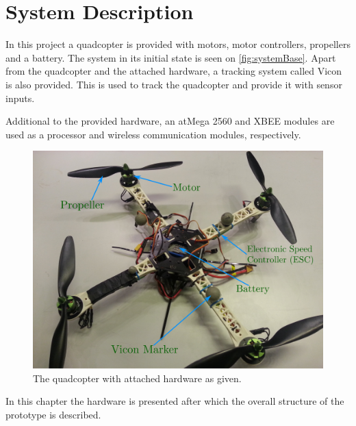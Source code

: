 \chapter{System Description}
In this project a quadcopter is provided with motors, motor controllers, propellers and a battery. The system in its initial state is seen on \autoref{fig:systemBase}. Apart from the quadcopter and the attached hardware, a tracking system called Vicon is also provided. This is used to track the quadcopter and provide it with sensor inputs.

Additional to the provided hardware, an atMega 2560 and XBEE modules are used as a processor and wireless communication modules, respectively.

\begin{figure}[H]
  \centering
  \includegraphics[width=.6\linewidth]{figures/quadcopterBaseLabels}
  \caption{The quadcopter with attached hardware as given.}
  \label{fig:systemBase}
\end{figure}

In this chapter the hardware is presented after which the overall structure of the prototype is described.